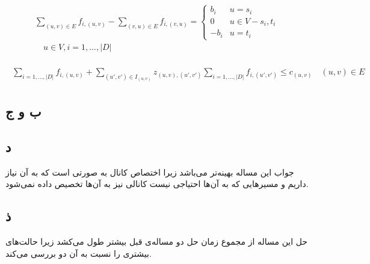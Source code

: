 \documentclass[paper=a4, fontsize=11pt]{article}
\numberwithin{equation}{section} %
\numberwithin{figure}{section} %
\numberwithin{table}{section} %
\begin{document}
\begin{align}
\begin{split}
	\sum_{(u,v) \in E} f_{i,(u,v)} - \sum_{(v,u) \in E} f_{i,(v,u)} = 
	\left \{
		\begin{array}{cc}
			b_i & u = s_i\\
			0 & u \in V - {s_i, t_i}\\
			-b_i & u = t_i
		\end{array}
	\right.
	\\
	\quad u \in V, i = {1, ..., |D|}
\end{split}
\end{align}

\begin{align}
\begin{split}
	\sum_{i = {1, ..., |D|}} f_{i,(u,v)} + \sum_{(u',v') \in I_{(u,v)}} z_{(u,v),(u',v')} \sum_{i = {1, ..., |D|}} f_{i,(u',v')} \le c_{(u,v)}
	\quad (u,v) \in E
\end{split}
\end{align}



\subsection{ب و ج}

\subsection{د}
جواب این مساله بهینه‌تر می‌باشد زیرا اختصاص کانال به صورتی است که به آن نیاز داریم و
مسیرهایی که به آن‌ها احتیاجی نیست کانالی نیز به آن‌ها تخصیص داده نمی‌شود.

\subsection{ذ}
حل این مساله از مجموع زمان حل دو مساله‌ی قبل بیشتر طول می‌کشد زیرا حالت‌های بیشتری را نسبت به آن دو بررسی می‌کند.
\end{document}
